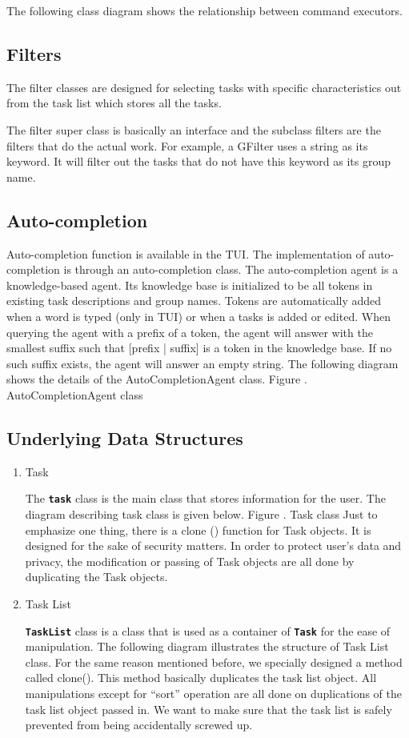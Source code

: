 \documentclass[12pt, a4paper]{article}
\newcommand{\cmdinline}[1]{{\bf \texttt{#1}}}
\begin{document}
\begin{enumerate}
\begin{enumerate}
The following class diagram shows the relationship between command executors.
\end{enumerate}
\end{enumerate}

\subsection{Filters}
The filter classes are designed for selecting tasks with specific characteristics out from the
task list which stores all the tasks.

The filter super class is basically an interface and the subclass filters are the filters that do the
actual work. For example, a GFilter uses a string as its keyword. It will filter out the tasks that
do not have this keyword as its group name.

\subsection{Auto-completion}
Auto-completion function is available in the TUI. The implementation of auto-completion is
through an auto-completion class. The auto-completion agent is a knowledge-based agent.
Its knowledge base is initialized to be all tokens in existing task descriptions and group names.
Tokens are automatically added when a word is typed (only in TUI) or when a tasks is added
or edited. When querying the agent with a prefix of a token, the agent will answer with the
smallest suffix such that [prefix | suffix] is a token in the knowledge base. If no such suffix
exists, the agent will answer an empty string.
The following diagram shows the details of the AutoCompletionAgent class.
Figure . AutoCompletionAgent class

\subsection{Underlying Data Structures}
\begin{enumerate}
\item Task

The \cmdinline{task} class is the main class that stores information for the user. The diagram describing
task class is given below.
Figure . Task class
Just to emphasize one thing, there is a clone () function for Task objects. It is designed for the
sake of security matters. In order to protect user’s data and privacy, the modification or
passing of Task objects are all done by duplicating the Task objects.
\item Task List

\cmdinline{TaskList} class is a class that is used as a container of \cmdinline{Task} for the ease of manipulation.
The following diagram illustrates the structure of Task List class.
For the same reason mentioned before, we specially designed a method called clone(). This
method basically duplicates the task list object. All manipulations except for “sort” operation
are all done on duplications of the task list object passed in. We want to make sure that the
task list is safely prevented from being accidentally screwed up.
\end{enumerate}
\end{document}
